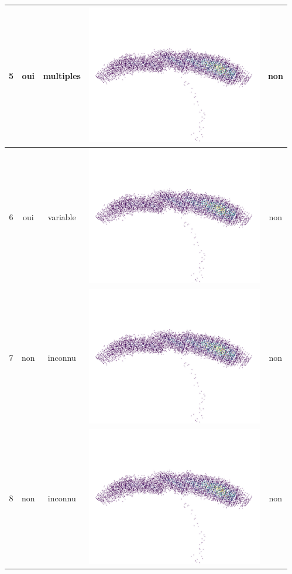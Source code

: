 \begin{table}[h]
\begin{tabular}{|c|c|c|c|c|}
\hline
5 & oui & multiples & \includegraphics[scale=0.25]{images/test1.png}  & non \\
\hline
6 & oui & variable & \includegraphics[scale=0.25]{images/test1.png}  & non \\
\hline
7 & non & inconnu & \includegraphics[scale=0.25]{images/test1.png} & non \\
\hline
8 & non & inconnu & \includegraphics[scale=0.25]{images/test1.png} & non \\

\end{tabular}
\end{table}
